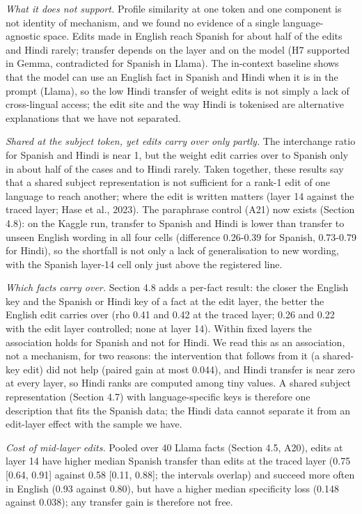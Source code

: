 \documentclass[11pt]{article}
\begin{document}
\emph{What it does not support.} Profile similarity at one token and one component is not identity of mechanism, and we found no evidence of a single language-agnostic space. Edits made in English reach Spanish for about half of the edits and Hindi rarely; transfer depends on the layer and on the model (H7 supported in Gemma, contradicted for Spanish in Llama). The in-context baseline shows that the model can use an English fact in Spanish and Hindi when it is in the prompt (Llama), so the low Hindi transfer of weight edits is not simply a lack of cross-lingual access; the edit site and the way Hindi is tokenised are alternative explanations that we have not separated.

\emph{Shared at the subject token, yet edits carry over only partly.} The interchange ratio for Spanish and Hindi is near 1, but the weight edit carries over to Spanish only in about half of the cases and to Hindi rarely. Taken together, these results say that a shared subject representation is not sufficient for a rank-1 edit of one language to reach another; where the edit is written matters (layer 14 against the traced layer; Hase et al., 2023). The paraphrase control (A21) now exists (Section 4.8): on the Kaggle run, transfer to Spanish and Hindi is lower than transfer to unseen English wording in all four cells (difference 0.26-0.39 for Spanish, 0.73-0.79 for Hindi), so the shortfall is not only a lack of generalisation to new wording, with the Spanish layer-14 cell only just above the registered line.

\emph{Which facts carry over.} Section 4.8 adds a per-fact result: the closer the English key and the Spanish or Hindi key of a fact at the edit layer, the better the English edit carries over (rho 0.41 and 0.42 at the traced layer; 0.26 and 0.22 with the edit layer controlled; none at layer 14). Within fixed layers the association holds for Spanish and not for Hindi. We read this as an association, not a mechanism, for two reasons: the intervention that follows from it (a shared-key edit) did not help (paired gain at most 0.044), and Hindi transfer is near zero at every layer, so Hindi ranks are computed among tiny values. A shared subject representation (Section 4.7) with language-specific keys is therefore one description that fits the Spanish data; the Hindi data cannot separate it from an edit-layer effect with the sample we have.

\emph{Cost of mid-layer edits.} Pooled over 40 Llama facts (Section 4.5, A20), edits at layer 14 have higher median Spanish transfer than edits at the traced layer (0.75 {[}0.64, 0.91{]} against 0.58 {[}0.11, 0.88{]}; the intervals overlap) and succeed more often in English (0.93 against 0.80), but have a higher median specificity loss (0.148 against 0.038); any transfer gain is therefore not free.
\end{document}
